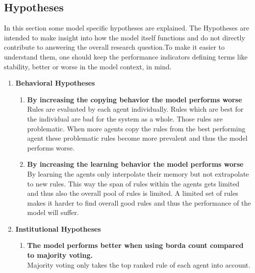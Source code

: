\documentclass[a4paper]{article}
\begin{document}
\subsection{Hypotheses}
In this section some model specific hypotheses are explained. The Hypotheses are intended to make insight into how the model itself 
functions  and do not directly contribute to answering the overall research question.To make it easier to understand 
them, one should keep the performance indicators defining terms like  stability, better or worse in the model context, in mind.\\ 
\begin{enumerate}
 \item \textbf{Behavioral Hypotheses} \begin{enumerate}
                                       \item \textbf{By increasing the copying behavior the model performs worse}\\
                                       Rules are evaluated by each agent individually. Rules which are best for the 
                                       individual are bad for the system as a whole. Those rules are problematic.
                                       When more agents copy the rules from the best performing agent these problematic 
                                       rules become more prevalent and thus the model performs worse.
                                       \item \textbf{By increasing the learning behavior the model performs worse} \\
                                       By learning the agents only interpolate their memory but not extrapolate to new rules.
                                       This way the span of rules within the agents gets limited and thus also the overall 
                                       pool of rules is limited. A limited set of rules makes it harder to find overall 
                                       good rules and thus the performance of the model will suffer. 
                                      \end{enumerate}
 \item \textbf{Institutional Hypotheses} \begin{enumerate}
					  \item \textbf{The model performs better when using borda count compared to 
					  majority voting.}\\
					   Majority voting only takes the top ranked rule of each agent into account. 

\end{enumerate}
\end{enumerate}
\end{document}
